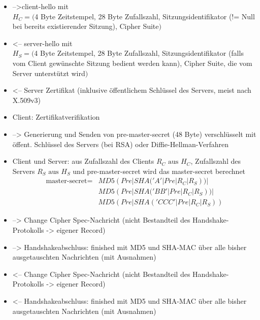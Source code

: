 \documentclass[
    12pt,
    headings=small,
    parskip=half,           %
    bibliography=totoc,
    numbers=noenddot,       %
    open=any,               %
    ]{scrreprt}
\newcommand{\mastersecret}{master-secret}
\newcommand{\premastersecret}{pre-master-secret}
\newcommand{\clienthello}{client-hello}
\newcommand{\serverhello}{server-hello}
\newcommand{\finished}{finished}
\newcommand{\changecipherspec}{Change Cipher Spec}
\begin{document}

\begin{itemize}
\item -->\clienthello{} mit \\
\(H_C = (\)4 Byte Zeitstempel, 28 Byte Zufallszahl, Sitzungsidentifikator (!= Null bei bereits existierender Sitzung), Cipher Suite\()\)

\item <-- \serverhello{} mit \\
\(H_S = (\)4 Byte Zeitstempel, 28 Byte Zufallszahl, Sitzungsidentifikator (falls vom Client gewünschte Sitzung bedient werden kann), Cipher Suite, die vom Server unterstützt wird\()\)

\item <-- Server Zertifikat (inklusive öffentlichem Schlüssel des Servers, meist nach X.509v3)

\item Client: Zertifikatverifikation

\item --> Generierung und Senden von \premastersecret{} (48 Byte) verschlüsselt mit öffent. Schlüssel des Servers (bei RSA) oder Diffie-Hellman-Verfahren

\item Client und Server: aus Zufallszahl des Clients \(R_C \text{ aus } H_C\), Zufallszahl des Servers \(R_S \text{ aus } H_S\) und \premastersecret{} wird das \mastersecret{} berechnet
\begin{align*}
\text{\mastersecret} = &MD5(Pre | SHA('A' | Pre | R_C | R_S)) |\\
	&MD5(Pre | SHA('BB' | Pre | R_C | R_S)) |\\
 	&MD5(Pre | SHA('CCC' | Pre | R_C | R_S))
\end{align*}

\item --> \changecipherspec{}-Nachricht (nicht Bestandteil des Handshake-Protokolls -> eigener Record)

\item --> Handshakeabschluss: \finished{} mit MD5 und SHA-MAC über alle bisher ausgetauschten Nachrichten (mit Ausnahmen)

\item <-- \changecipherspec{}-Nachricht (nicht Bestandteil des Handshake-Protokolls -> eigener Record)

\item <-- Handshakeabschluss: \finished{} mit MD5 und SHA-MAC über alle bisher ausgetauschten Nachrichten (mit Ausnahmen)
\end{itemize}
\end{document}

